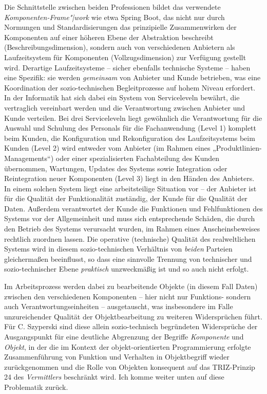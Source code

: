 \documentclass[11pt,a4paper]{article}
\begin{document}
Die Schnittstelle zwischen beiden Professionen bildet das verwendete
\emph{Komponenten-Frame"|work} wie etwa Spring Boot, das nicht nur durch
Normungen und Standardisierungen das prinzipielle Zusammenwirken der
Komponenten auf einer höheren Ebene der Abstraktion beschreibt
(Beschreibungsdimension), sondern auch von verschiedenen Anbietern als
Laufzeitsystem für Komponenten (Vollzugsdimension) zur Verfügung gestellt
wird. Derartige Laufzeitsysteme -- sicher ebenfalls technische Systeme --
haben eine Spezifik: sie werden \emph{gemeinsam} von Anbieter und Kunde
betrieben, was eine Koordination der sozio-technischen Begleitprozesse auf
hohem Niveau erfordert. In der Informatik hat sich dabei ein System von
Serviceleveln bewährt, die vertraglich vereinbart werden und die Verantwortung
zwischen Anbieter und Kunde verteilen. Bei drei Serviceleveln liegt gewöhnlich
die Verantwortung für die Auswahl und Schulung des Personals für die
Fachanwendung (Level 1) komplett beim Kunden, die Konfiguration und
Rekonfiguration des Laufzeitsystems beim Kunden (Level 2) wird entweder vom
Anbieter (im Rahmen eines „Produktlinien-Managements“) oder einer
spezialisierten Fachabteilung des Kunden übernommen, Wartungen, Updates des
Systems sowie Integration oder Reintegration neuer Komponenten (Level 3) liegt
in den Händen des Anbieters. In einem solchen System liegt eine arbeitsteilige
Situation vor -- der Anbieter ist für die Qualität der Funktionalität
zuständig, der Kunde für die Qualität der Daten. Außerdem verantwortet der
Kunde die Funktionen und Fehlfunktionen des Systems vor der Allgemeinheit und
muss sich entsprechende Schäden, die durch den Betrieb des Systems verursacht
wurden, im Rahmen eines Anscheinsbeweises rechtlich zuordnen lassen.  Die
operative (technische) Qualität des realweltlichen Systems wird in diesem
sozio-technischen Verhältnis von \emph{beiden} Parteien gleichermaßen
beeinflusst, so dass eine sinnvolle Trennung von technischer und
sozio-technischer Ebene \emph{praktisch} unzweckmäßig ist und so auch nicht
erfolgt.

Im Arbeitsprozess werden dabei zu bearbeitende Objekte (in diesem Fall Daten)
zwischen den verschiedenen Komponenten -- hier nicht nur Funktions- sondern
auch Verantwortungseinheiten -- ausgetauscht, was insbesondere im Falle
unzureichender Qualität der Objektbearbeitung zu weiteren Widersprüchen führt.
Für C. Szyperski \cite{Szyperski2002} sind diese allein sozio-technisch
begründeten Widersprüche der Ausgangspunkt für eine deutliche Abgrenzung der
Begriffe \emph{Komponente} und \emph{Objekt}, in der die im Kontext der
objekt-orientierten Programmierung erfolgte Zusammenführung von Funktion und
Verhalten in Objektbegriff wieder zurückgenommen und die Rolle von Objekten
konsequent auf das TRIZ-Prinzip 24 des \emph{Vermittlers} beschränkt wird.
Ich komme weiter unten auf diese Problematik zurück.
\end{document}
